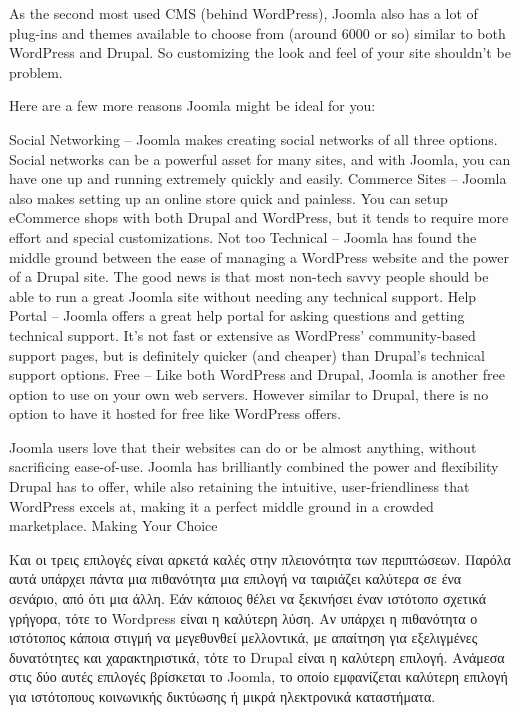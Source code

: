 \documentclass[12pt]{report}
\begin{document}
\begin{itemize}
As the second most used CMS (behind WordPress), Joomla also has a lot of plug-ins and themes available to choose from (around 6000 or so) similar to both WordPress and Drupal. So customizing the look and feel of your site shouldn’t be problem.

Here are a few more reasons Joomla might be ideal for you:

    Social Networking – Joomla makes creating social networks of all three options. Social networks can be a powerful asset for many sites, and with Joomla, you can have one up and running extremely quickly and easily.
    Commerce Sites – Joomla also makes setting up an online store quick and painless. You can setup eCommerce shops with both Drupal and WordPress, but it tends to require more effort and special customizations.
    Not too Technical – Joomla has found the middle ground between the ease of managing a WordPress website and the power of a Drupal site. The good news is that most non-tech savvy people should be able to run a great Joomla site without needing any technical support.
    Help Portal – Joomla offers a great help portal for asking questions and getting technical support. It’s not fast or extensive as WordPress’ community-based support pages, but is definitely quicker (and cheaper) than Drupal’s technical support options.
    Free – Like both WordPress and Drupal, Joomla is another free option to use on your own web servers. However similar to Drupal, there is no option to have it hosted for free like WordPress offers.

Joomla users love that their websites can do or be almost anything, without sacrificing ease-of-use. Joomla has brilliantly combined the power and flexibility Drupal has to offer, while also retaining the intuitive, user-friendliness that WordPress excels at, making it a perfect middle ground in a crowded marketplace.
Making Your Choice

Και οι τρεις επιλογές είναι αρκετά καλές στην πλειονότητα των περιπτώσεων. Παρόλα αυτά υπάρχει πάντα μια πιθανότητα μια επιλογή να ταιριάζει καλύτερα σε ένα σενάριο, από ότι μια άλλη. Εάν κάποιος θέλει να ξεκινήσει έναν ιστότοπο σχετικά γρήγορα, τότε το \textlatin{Wordpress} είναι η καλύτερη λύση. Αν υπάρχει η πιθανότητα ο ιστότοπος κάποια στιγμή να μεγεθυνθεί μελλοντικά, με απαίτηση για εξελιγμένες δυνατότητες και χαρακτηριστικά, τότε το \textlatin{Drupal} είναι η καλύτερη επιλογή. Ανάμεσα στις δύο αυτές επιλογές βρίσκεται το \textlatin{Joomla}, το οποίο εμφανίζεται καλύτερη επιλογή για ιστότοπους κοινωνικής δικτύωσης ή μικρά ηλεκτρονικά καταστήματα.


\end{itemize}
\end{document}
